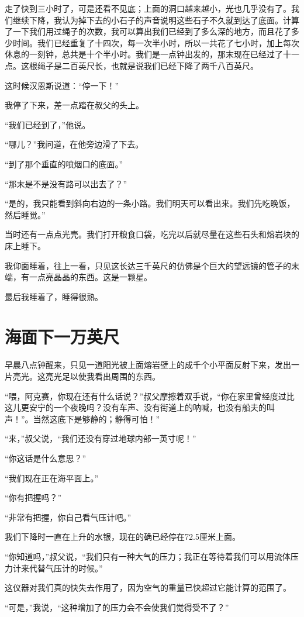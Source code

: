 \documentclass[10pt]{book}
\begin{document}
走了快到三小时了，可是还看不见底；上面的洞口越来越小，光也几乎没有了。我们继续下降，我认为掉下去的小石子的声音说明这些石子不久就到达了底面。计算了一下我们用过绳子的次数，我可以算出我们已经到了多么深的地方，而且花了多少时间。我们已经重复了十四次，每一次半小时，所以一共花了七小时，加上每次休息的一刻钟，总共是十个半小时。我们是一点钟出发的，那末现在已经过了十一点。这根绳子是二百英尺长，也就是说我们已经下降了两千八百英尺。

这时候汉恩斯说道：“停一下！”

我停了下来，差一点踏在叔父的头上。

“我们已经到了，”他说。

“哪儿？”我问道，在他旁边滑了下去。

“到了那个垂直的喷烟口的底面。”

“那末是不是没有路可以出去了？”

“是的，我只能看到斜向右边的一条小路。我们明天可以看出来。我们先吃晚饭，然后睡觉。”

当时还有一点点光壳。我们打开粮食口袋，吃完以后就尽量在这些石头和熔岩块的床上睡下。

我仰面睡着，往上一看，只见这长达三千英尺的仿佛是个巨大的望远镜的管子的末端，有一点亮晶晶的东西。这是一颗星。

最后我睡着了，睡得很熟。
\chapter{海面下一万英尺}
早晨八点钟醒来，只见一道阳光被上面熔岩壁上的成千个小平面反射下来，发出一片亮光。这亮光足以使我看出周围的东西。

“喂，阿克赛，你现在还有什么话说？”叔父摩擦着双手说，“你在家里曾经度过比这儿更安宁的一个夜晚吗？没有车声、没有街道上的呐喊，也没有船夫的叫声！”。当然这底下是够静的；静得可怕！”

“来，”叔父说，“我们还没有穿过地球内部一英寸呢！”

“你这话是什么意思？”

“我们现在正在海平面上。”

“你有把握吗？”

“非常有把握，你自己看气压计吧。”

我们下降时一直在上升的水银，现在的确已经停在72.5厘米上面。

“你知道吗，”叔父说，“我们只有一种大气的压力；我正在等待着我们可以用流体压力计来代替气压计的时候。”

这仪器对我们真的快失去作用了，因为空气的重量已快超过它能计算的范围了。

“可是，”我说，“这种增加了的压力会不会使我们觉得受不了？”
\end{document}
